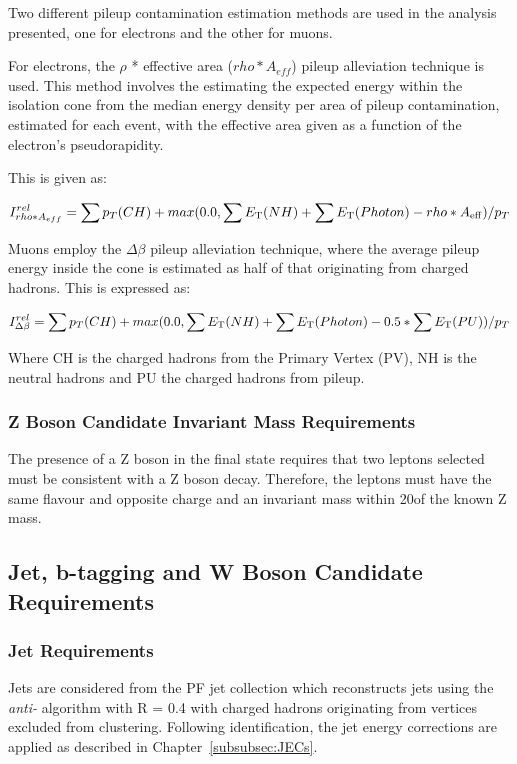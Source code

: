 Two different pileup contamination estimation methods are used in the analysis presented, one for electrons and the other for muons.

For electrons, the $\rho$ * effective area ($rho * A_{eff}$) pileup alleviation technique is used.
This method involves the estimating the expected energy within the isolation cone from the median energy density per area of pileup contamination, estimated for each event, with the effective area given as a function of the electron's pseudorapidity.

This is given as: 

\begin{equation}
I^{rel}_{rho * A_{eff}} = \sum p_T(CH) + max (0.0, \sum E_{\rm T}(NH) + \sum E_{\rm T}(Photon) -rho*A_{\rm eff} )/p_T \\
\end{equation}\label{eq:rhoEffA}

Muons employ the $\Delta\beta$ pileup alleviation technique, where the average pileup energy inside the cone is estimated as half of that originating from charged hadrons.
This is expressed as:

\begin{equation}
I^{rel}_{\Delta\beta} = \sum p_T(CH) + max (0.0, \sum E_{\rm T}(NH) + \sum E_{\rm T}(Photon) - 0.5 * \sum E_{\rm T}(PU))/p_T \\
\end{equation}\label{eq:deltaBeta}

Where CH is the charged hadrons from the Primary Vertex (PV), NH is the neutral hadrons and PU the charged hadrons from pileup.

\subsubsection{Z Boson Candidate Invariant Mass Requirements}
The presence of a Z boson in the final state requires that two leptons selected must be consistent with a Z boson decay.
Therefore, the leptons must have the same flavour and opposite charge and an invariant mass within 20\GeVcc of the known Z mass.

\subsection{Jet, b-tagging and W Boson Candidate Requirements}
\subsubsection{Jet Requirements}
Jets are considered from the PF jet collection which reconstructs jets using the \emph{anti-\kt} algorithm with R = 0.4 with charged hadrons originating from \PU vertices excluded from clustering.
Following identification, the jet energy corrections are applied as described in Chapter~\ref{subsubsec:JECs}.

